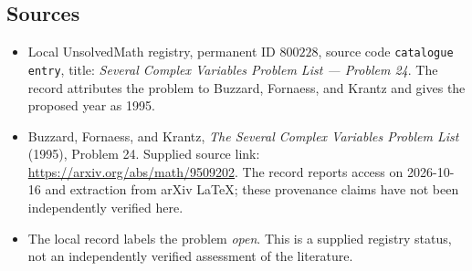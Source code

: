 \documentclass[11pt]{article}
\begin{document}
\subsection{Sources}
\begin{itemize}
\item Local UnsolvedMath registry, permanent ID \(800228\), source code \texttt{catalogue entry}, title: \emph{Several Complex Variables Problem List --- Problem 24}. The record attributes the problem to Buzzard, Fornaess, and Krantz and gives the proposed year as 1995.
\item Buzzard, Fornaess, and Krantz, \emph{The Several Complex Variables Problem List} (1995), Problem 24. Supplied source link: \url{https://arxiv.org/abs/math/9509202}. The record reports access on 2026-10-16 and extraction from arXiv LaTeX; these provenance claims have not been independently verified here.
\item The local record labels the problem \emph{open}. This is a supplied registry status, not an independently verified assessment of the literature.
\end{itemize}
\end{document}
